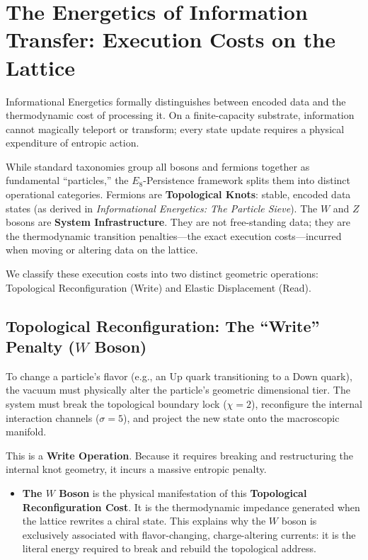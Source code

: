 \section{The Energetics of Information Transfer: Execution Costs on the Lattice}

Informational Energetics formally distinguishes between encoded data and the thermodynamic cost of processing it. On a finite-capacity substrate, information cannot magically teleport or transform; every state update requires a physical expenditure of entropic action. 

While standard taxonomies group all bosons and fermions together as fundamental ``particles,'' the $E_8$-Persistence framework splits them into distinct operational categories. Fermions are \textbf{Topological Knots}: stable, encoded data states (as derived in \textit{Informational Energetics: The Particle Sieve}). The $W$ and $Z$ bosons are \textbf{System Infrastructure}. They are not free-standing data; they are the thermodynamic transition penalties---the exact execution costs---incurred when moving or altering data on the lattice.

We classify these execution costs into two distinct geometric operations: Topological Reconfiguration (Write) and Elastic Displacement (Read).

\subsection{Topological Reconfiguration: The ``Write'' Penalty (\texorpdfstring{$W$}{W} Boson)}

To change a particle's flavor (e.g., an Up quark transitioning to a Down quark), the vacuum must physically alter the particle's geometric dimensional tier. The system must break the topological boundary lock ($\chi=2$), reconfigure the internal interaction channels ($\sigma=5$), and project the new state onto the macroscopic manifold. 

This is a \textbf{Write Operation}. Because it requires breaking and restructuring the internal knot geometry, it incurs a massive entropic penalty. 
\begin{itemize}
    \item \textbf{The $W$ Boson} is the physical manifestation of this \textbf{Topological Reconfiguration Cost}. It is the thermodynamic impedance generated when the lattice rewrites a chiral state. This explains why the $W$ boson is exclusively associated with flavor-changing, charge-altering currents: it is the literal energy required to break and rebuild the topological address.
\end{itemize}

